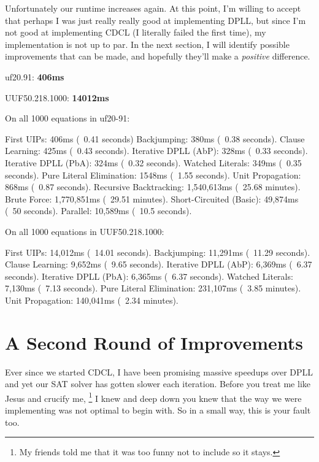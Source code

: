 \documentclass[../main.tex]{subfiles}
\begin{document}
Unfortunately our runtime increases again. At this point, I'm willing to accept
that perhaps I was just really really good at implementing DPLL, but since I'm not 
good at implementing CDCL (I literally failed the first time), my implementation 
is not up to par. In the next section, I will identify possible improvements that 
can be made, and hopefully they'll make a \textit{positive} difference.

\noindent
uf20.91: \textbf{406ms}

\noindent
UUF50.218.1000: \textbf{14012ms}

\begin{FVerbatim}
On all 1000 equations in uf20-91:

First UIPs:                406ms (~0.41 seconds)
Backjumping:               380ms (~0.38 seconds).
Clause Learning:           425ms (~0.43 seconds).
Iterative DPLL (AbP):      328ms (~0.33 seconds).
Iterative DPLL (PbA):      324ms (~0.32 seconds).
Watched Literals:          349ms (~0.35 seconds).
Pure Literal Elimination:  1548ms (~1.55 seconds).
Unit Propagation:          868ms (~0.87 seconds).
Recursive Backtracking:    1,540,613ms (~25.68 minutes).
Brute Force:               1,770,851ms (~29.51 minutes).
Short-Circuited (Basic):   49,874ms (~50 seconds).
Parallel:                  10,589ms (~10.5 seconds).

On all 1000 equations in UUF50.218.1000:

First UIPs:               14,012ms (~14.01 seconds).
Backjumping:              11,291ms (~11.29 seconds).
Clause Learning:          9,652ms (~9.65 seconds).
Iterative DPLL (AbP):     6,369ms (~6.37 seconds).
Iterative DPLL (PbA):     6,365ms (~6.37 seconds).
Watched Literals:         7,130ms (~7.13 seconds).
Pure Literal Elimination: 231,107ms (~3.85 minutes).
Unit Propagation:         140,041ms (~2.34 minutes).
\end{FVerbatim}

\section{A Second Round of Improvements}

Ever since we started CDCL, I have been promising massive speedups over DPLL 
and yet our SAT solver has gotten slower each iteration. Before you treat me 
like Jesus and crucify me,
\footnote{My friends told me that it was too funny not to include so it stays.}
I knew and deep down you knew that the way we were implementing was not optimal
to begin with. So in a small way, this is your fault too. 
\end{document}

